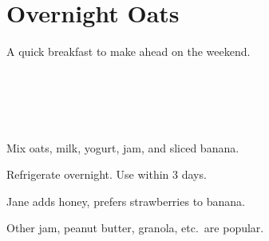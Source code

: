 \section{Overnight Oats}

\begin{recipestats}[
        servings=3,
        preptime=10 \minute,
        inactivetime=12 \hour,
        source=Mike \& Jane,
        original=\citetitle{kwonOvernightOats}~\cite{kwonOvernightOats},
    ]
\end{recipestats}

\begin{recipeabstract}
    A quick breakfast to make ahead on the weekend.
\end{recipeabstract}

\begin{ingredientcolumns}
    \begin{ingredientblock}
        \\
        \\
    \end{ingredientblock}
    \begin{ingredientblock}
        \\
    \end{ingredientblock}
\end{ingredientcolumns}

\begin{preparation}
\item Mix oats, milk, yogurt, jam, and sliced banana.

\item Refrigerate overnight.
    Use within 3 days.
\end{preparation}

\begin{variation}
\item Jane adds honey, prefers strawberries to banana.

\item Other jam, peanut butter, granola, etc.\ are popular.
\end{variation}

\recipeend%
